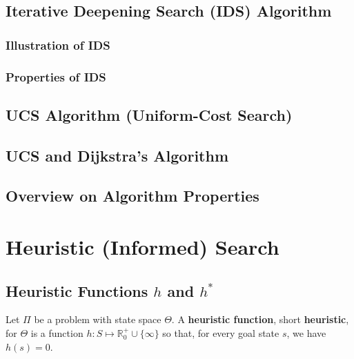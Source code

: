 \documentclass[conference, a4paper]{styles/acmsiggraph}
\begin{document}
    \subsection{Iterative Deepening Search (IDS) Algorithm}
            \subsubsection{Illustration of IDS}
            \subsubsection{Properties of IDS}
    \subsection{UCS Algorithm (Uniform-Cost Search)}
    \subsection{UCS and Dijkstra's Algorithm}
    \subsection{Overview on Algorithm Properties}
        
        
        
        
        
        
        
        
        
        
\section{Heuristic (Informed) Search}
    \subsection{Heuristic Functions $h$ and $h^*$}
        Let $\Pi$ be a problem with state space $\Theta$.
        A \textbf{heuristic function}, short \textbf{heuristic}, for $\Theta$ is a function $h: S \mapsto \mathbb{R}_0^+ \cup \{\infty\}$ so that, for every goal state $s$, we have $h(s) = 0$.\newline
        
\end{document}
